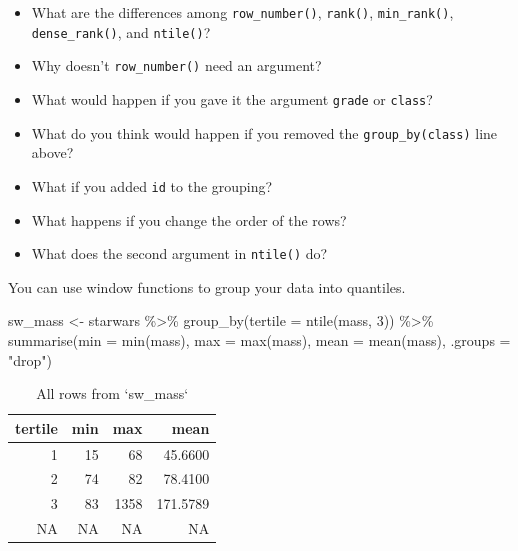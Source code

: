\documentclass[
  oneside]{book}
\newenvironment{Shaded}{\begin{snugshade}}{\end{snugshade}}
\newcommand{\AttributeTok}[1]{\textcolor[rgb]{0.77,0.63,0.00}{#1}}
\newcommand{\DecValTok}[1]{\textcolor[rgb]{0.00,0.00,0.81}{#1}}
\newcommand{\FunctionTok}[1]{\textcolor[rgb]{0.00,0.00,0.00}{#1}}
\newcommand{\NormalTok}[1]{#1}
\newcommand{\OtherTok}[1]{\textcolor[rgb]{0.56,0.35,0.01}{#1}}
\newcommand{\SpecialCharTok}[1]{\textcolor[rgb]{0.00,0.00,0.00}{#1}}
\newcommand{\StringTok}[1]{\textcolor[rgb]{0.31,0.60,0.02}{#1}}
\providecommand{\tightlist}{%
  \setlength{\itemsep}{0pt}\setlength{\parskip}{0pt}}
\begin{document}
\begin{try}

\begin{itemize}
\tightlist
\item
  What are the differences among \texttt{row\_number()}, \texttt{rank()}, \texttt{min\_rank()}, \texttt{dense\_rank()}, and \texttt{ntile()}?
\item
  Why doesn't \texttt{row\_number()} need an argument?
\item
  What would happen if you gave it the argument \texttt{grade} or \texttt{class}?
\item
  What do you think would happen if you removed the \texttt{group\_by(class)} line above?
\item
  What if you added \texttt{id} to the grouping?
\item
  What happens if you change the order of the rows?
\item
  What does the second argument in \texttt{ntile()} do?
\end{itemize}

\end{try}

You can use window functions to group your data into quantiles.

\begin{Shaded}
\begin{Highlighting}[]
\NormalTok{sw\_mass }\OtherTok{\textless{}{-}}\NormalTok{ starwars }\SpecialCharTok{\%\textgreater{}\%}
  \FunctionTok{group\_by}\NormalTok{(}\AttributeTok{tertile =} \FunctionTok{ntile}\NormalTok{(mass, }\DecValTok{3}\NormalTok{)) }\SpecialCharTok{\%\textgreater{}\%}
  \FunctionTok{summarise}\NormalTok{(}\AttributeTok{min =} \FunctionTok{min}\NormalTok{(mass),}
            \AttributeTok{max =} \FunctionTok{max}\NormalTok{(mass),}
            \AttributeTok{mean =} \FunctionTok{mean}\NormalTok{(mass),}
            \AttributeTok{.groups =} \StringTok{"drop"}\NormalTok{)}
\end{Highlighting}
\end{Shaded}

\begin{table}

\caption{\label{tab:unnamed-chunk-2}All rows from `sw_mass`}
\centering
\begin{tabular}[t]{r|r|r|r}
\hline
tertile & min & max & mean\\
\hline
1 & 15 & 68 & 45.6600\\
\hline
2 & 74 & 82 & 78.4100\\
\hline
3 & 83 & 1358 & 171.5789\\
\hline
NA & NA & NA & NA\\
\hline
\end{tabular}
\end{table}
\end{document}

